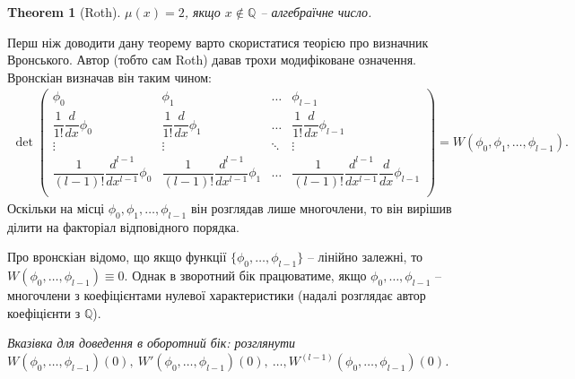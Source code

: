 \documentclass[a4paper, 10pt]{article}
\theoremstyle{theoremdd}
\newtheorem{theorem}{Theorem}[subsection]
\theoremstyle{theoremdd}
\theoremstyle{theoremdd}
\theoremstyle{theoremdd}
\theoremstyle{theoremdd}
\theoremstyle{theoremdd}
\theoremstyle{theoremdd}
\theoremstyle{theoremdd}
\theoremstyle{theoremdd}
\theoremstyle{theoremdd}
\theoremstyle{theoremdd}
\theoremstyle{theoremdd}
\theoremstyle{theoremdd}
\theoremstyle{theoremdd}
\theoremstyle{theoremdd}
\begin{document}
\begin{theorem}[Roth]
$\mu(x) = 2$, якщо $x \notin \mathbb{Q}$ -- алгебраїчне число.
\end{theorem}

Перш ніж доводити дану теорему варто скористатися теорією про визначник Вронського. Автор (тобто сам Roth) давав трохи модифіковане означення. Вронскіан визначав він таким чином:
\begin{align*}
\det \begin{pmatrix}
\phi_0 & \phi_1 & \dots & \phi_{l-1} \\
\dfrac{1}{1!} \dfrac{d}{dx} \phi_0 & \dfrac{1}{1!} \dfrac{d}{dx} \phi_1 & \dots & \dfrac{1}{1!} \dfrac{d}{dx} \phi_{l-1} \\
\vdots & \vdots & \ddots & \vdots \\
\dfrac{1}{(l-1)!} \dfrac{d^{l-1}}{dx^{l-1}} \phi_0 & \dfrac{1}{(l-1)!} \dfrac{d^{l-1}}{dx^{l-1}} \phi_1 & \dots & \dfrac{1}{(l-1)!} \dfrac{d^{l-1}}{dx^{l-1}} \dfrac{d}{dx} \phi_{l-1} \\
\end{pmatrix} = W(\phi_0,\phi_{1},\dots,\phi_{l-1}).
\end{align*}
Оскільки на місці $\phi_0,\phi_1,\dots,\phi_{l-1}$ він розглядав лише многочлени, то він вирішив ділити на факторіал відповідного порядка.

Про вронскіан відомо, що якщо функції $\{\phi_0,\dots,\phi_{l-1}\}$ -- лінійно залежні, то $W(\phi_0,\dots,\phi_{l-1}) \equiv 0$. Однак в зворотний бік працюватиме, якщо $\phi_0,\dots,\phi_{l-1}$ -- многочлени з коефіцієнтами нулевої характеристики (надалі розглядає автор коефіцієнти з $\mathbb{Q}$).

\textit{Вказівка для доведення в оборотний бік: розглянути \\
$W(\phi_0,\dots,\phi_{l-1})(0),\ W'(\phi_0,\dots,\phi_{l-1})(0),\ \dots, W^{(l-1)}(\phi_0,\dots,\phi_{l-1})(0)$.}
\end{document}
